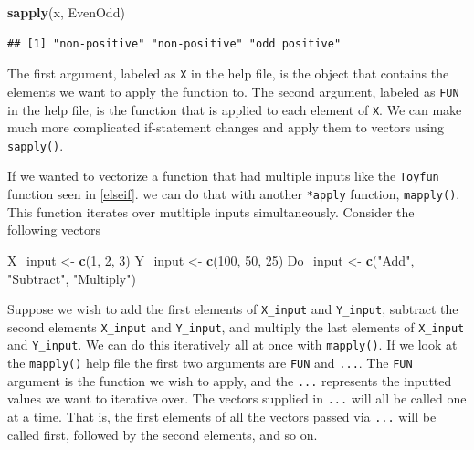 \documentclass[
]{book}
\newenvironment{Shaded}{\begin{snugshade}}{\end{snugshade}}
\newcommand{\DecValTok}[1]{\textcolor[rgb]{0.00,0.00,0.81}{#1}}
\newcommand{\KeywordTok}[1]{\textcolor[rgb]{0.13,0.29,0.53}{\textbf{#1}}}
\newcommand{\NormalTok}[1]{#1}
\newcommand{\StringTok}[1]{\textcolor[rgb]{0.31,0.60,0.02}{#1}}
\begin{document}
\begin{Shaded}
\begin{Highlighting}[]
\KeywordTok{sapply}\NormalTok{(x, EvenOdd)}
\end{Highlighting}
\end{Shaded}

\begin{verbatim}
## [1] "non-positive" "non-positive" "odd positive"
\end{verbatim}

The first argument, labeled as \texttt{X} in the help file, is the object that contains the elements we want to apply the function to. The second argument, labeled as \texttt{FUN} in the help file, is the function that is applied to each element of \texttt{X}. We can make much more complicated if-statement changes and apply them to vectors using \texttt{sapply()}.

If we wanted to vectorize a function that had multiple inputs like the \texttt{Toyfun} function seen in \ref{elseif}. we can do that with another \texttt{*apply} function, \texttt{mapply()}. This function iterates over mutltiple inputs simultaneously. Consider the following vectors

\begin{Shaded}
\begin{Highlighting}[]
\NormalTok{X_input <-}\StringTok{ }\KeywordTok{c}\NormalTok{(}\DecValTok{1}\NormalTok{, }\DecValTok{2}\NormalTok{, }\DecValTok{3}\NormalTok{)}
\NormalTok{Y_input <-}\StringTok{ }\KeywordTok{c}\NormalTok{(}\DecValTok{100}\NormalTok{, }\DecValTok{50}\NormalTok{, }\DecValTok{25}\NormalTok{)}
\NormalTok{Do_input <-}\StringTok{ }\KeywordTok{c}\NormalTok{(}\StringTok{"Add"}\NormalTok{, }\StringTok{"Subtract"}\NormalTok{, }\StringTok{"Multiply"}\NormalTok{)}
\end{Highlighting}
\end{Shaded}

Suppose we wish to add the first elements of \texttt{X\_input} and \texttt{Y\_input}, subtract the second elements \texttt{X\_input} and \texttt{Y\_input}, and multiply the last elements of \texttt{X\_input} and \texttt{Y\_input}. We can do this iteratively all at once with \texttt{mapply()}. If we look at the \texttt{mapply()} help file the first two arguments are \texttt{FUN} and \texttt{...}. The \texttt{FUN} argument is the function we wish to apply, and the \texttt{...} represents the inputted values we want to iterative over. The vectors supplied in \texttt{...} will all be called one at a time. That is, the first elements of all the vectors passed via \texttt{...} will be called first, followed by the second elements, and so on.
\end{document}
